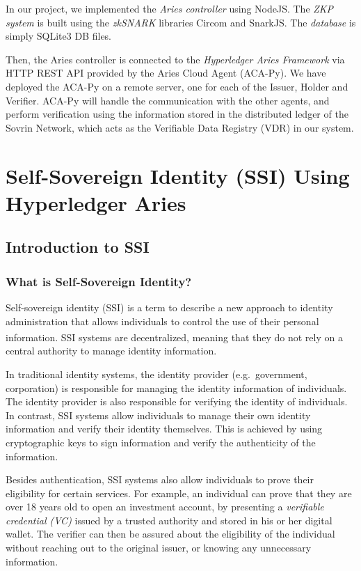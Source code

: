 \documentclass[
]{report}
\begin{document}
In our project, we implemented the \emph{Aries controller} using NodeJS.
The \emph{ZKP system} is built using the \emph{zkSNARK} libraries
Circom and SnarkJS. The \emph{database} is simply SQLite3 DB files.

Then, the Aries controller is connected to the \emph{Hyperledger Aries
Framework} via HTTP REST API provided by the Aries Cloud Agent (ACA-Py).
We have deployed the ACA-Py on a remote server, one for each of the
Issuer, Holder and Verifier. ACA-Py will handle the communication with
the other agents, and perform verification using the information stored
in the distributed ledger of the Sovrin Network, which acts as the
Verifiable Data Registry (VDR) in our system.
\chapter{Self-Sovereign Identity (SSI) Using Hyperledger Aries}

\section{Introduction to SSI}
\subsection{What is Self-Sovereign Identity?}
Self-sovereign identity (SSI) is a term to describe a new approach to
identity administration that allows individuals to control the use of
their personal information\textsuperscript{\cite{SovrinFAQ,EdxSSI}}.
SSI systems are decentralized, meaning that
they do not rely on a central authority to manage identity information.

In traditional identity systems, the identity provider (e.g.~government,
corporation) is responsible for managing the identity information of
individuals. The identity provider is also responsible for verifying
the identity of individuals. In contrast, SSI systems allow individuals
to manage their own identity information and verify their identity
themselves. This is achieved by using cryptographic keys to sign
information and verify the authenticity of the information.

Besides authentication, SSI systems also allow individuals to prove their
eligibility for certain services. For example, an individual can prove
that they are over 18 years old to open an investment account, by
presenting a \emph{verifiable credential (VC)} issued by a trusted
authority and stored in his or her digital wallet. The verifier can
then be assured about the eligibility of the individual without reaching
out to the original issuer, or knowing any unnecessary information.
\end{document}
